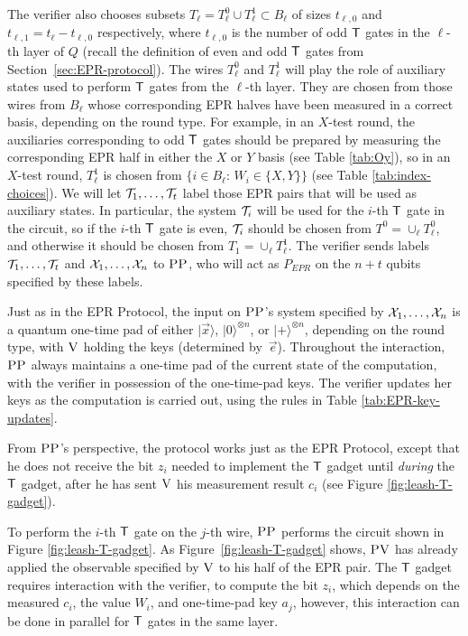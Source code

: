 \documentclass[11pt]{article}
\newcommand{\ket}[1]{|#1\rangle}
\newcommand{\ver}{\textsc{V}}
\newcommand{\pv}{\textsc{PV}}
\newcommand{\pp}{\textsc{PP}}
\begin{document}
The verifier also chooses subsets $T_\ell = T_\ell^0 \cup T_\ell^1 \subset B_\ell$ of sizes $t_{\ell,0}$ and $t_{\ell,1} = t_\ell-t_{\ell,0}$ respectively, where $t_{\ell,0}$ is the number of odd $\sf T$ gates in the $\ell$-th layer of $Q$ (recall the definition of even and odd $\sf T$ gates from Section~\ref{sec:EPR-protocol}). The wires $T^0_\ell$ and $T^1_\ell$ will play the role of auxiliary states used to perform $\sf T$ gates from the $\ell$-th layer. They are chosen from those wires from $B_\ell$ whose corresponding EPR halves have been measured in a correct basis, depending on the round type.  For example, in an $X$-test round, the auxiliaries corresponding to odd $\sf T$ gates should be prepared by measuring the corresponding EPR half in either the $X$ or $Y$ basis (see Table \ref{tab:Oy}), so in an $X$-test round, $T_\ell^1$ is chosen from $\{i\in B_\ell:\,W_i\in \{X,Y\}\}$ (see Table \ref{tab:index-choices}). We will let ${\cal T}_1,\dots,{\cal T}_t$ label those EPR pairs that will be used as auxiliary states. In particular, the system ${\cal T}_i$ will be used for the $i$-th $\sf T$ gate in the circuit, so if the $i$-th $\sf T$ gate is even, ${\cal T}_i$ should be chosen from $T^0=\cup_\ell T_\ell^0$, and otherwise it should be chosen from $T_1=\cup_\ell T_\ell^1$. The verifier sends labels ${\cal T}_1,\dots,{\cal T}_t$ and ${\cal X}_1,\dots,{\cal X}_n$ to $\pp$, who will act as $P_{EPR}$ on the $n+t$ qubits specified by these labels.


Just as in the EPR Protocol, the input on $\pp$'s system specified by ${\cal X}_1,\dots,{\cal X}_n$ is a quantum one-time pad of either $\ket{\vec{x}}$, $\ket{0}^{\otimes n}$, or $\ket{+}^{\otimes n}$, depending on the round type, with $\ver$ holding the keys (determined by~$\vec{e}$). Throughout the interaction, $\pp$ always maintains a one-time pad of the current state of the computation, with the verifier in possession of the one-time-pad keys. The verifier updates her keys as the computation is carried out, using the rules in Table \ref{tab:EPR-key-updates}. 




From $\pp$'s perspective, the protocol works just as the EPR Protocol, except that he does not receive the bit $z_i$ needed to implement the $\sf T$ gadget until \emph{during} the $\sf T$ gadget, after he has sent $\ver$ his measurement result $c_i$ (see Figure \ref{fig:leash-T-gadget}).


 
To perform the $i$-th $\sf T$ gate on the $j$-th wire, $\pp$ performs the circuit shown in Figure \ref{fig:leash-T-gadget}. As Figure~\ref{fig:leash-T-gadget} shows, $\pv$ has already applied the observable specified by $\ver$ to his half of the EPR pair. The $\sf T$ gadget requires interaction with the verifier, to compute the bit $z_i$, which depends on the measured $c_i$, the value $W_i$, and one-time-pad key $a_j$, however, this interaction can be done in parallel for $\sf T$ gates in the same layer. 
\end{document}
